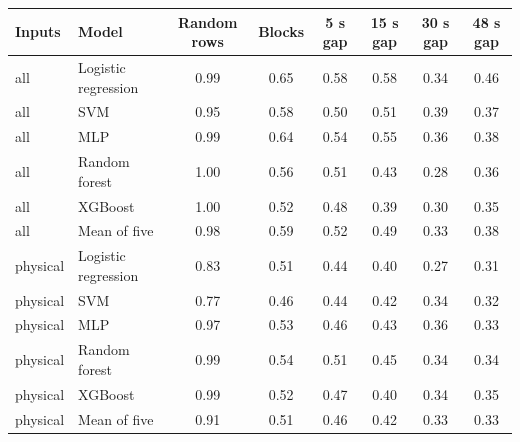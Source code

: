 \begin{tabular}{llcccccc}
\toprule
Inputs & Model & Random rows & Blocks & 5 s gap & 15 s gap & 30 s gap & 48 s gap \\
\midrule
all & Logistic regression & 0.99 & 0.65 & 0.58 & 0.58 & 0.34 & 0.46 \\
all & SVM & 0.95 & 0.58 & 0.50 & 0.51 & 0.39 & 0.37 \\
all & MLP & 0.99 & 0.64 & 0.54 & 0.55 & 0.36 & 0.38 \\
all & Random forest & 1.00 & 0.56 & 0.51 & 0.43 & 0.28 & 0.36 \\
all & XGBoost & 1.00 & 0.52 & 0.48 & 0.39 & 0.30 & 0.35 \\
all & Mean of five & 0.98 & 0.59 & 0.52 & 0.49 & 0.33 & 0.38 \\
physical & Logistic regression & 0.83 & 0.51 & 0.44 & 0.40 & 0.27 & 0.31 \\
physical & SVM & 0.77 & 0.46 & 0.44 & 0.42 & 0.34 & 0.32 \\
physical & MLP & 0.97 & 0.53 & 0.46 & 0.43 & 0.36 & 0.33 \\
physical & Random forest & 0.99 & 0.54 & 0.51 & 0.45 & 0.34 & 0.34 \\
physical & XGBoost & 0.99 & 0.52 & 0.47 & 0.40 & 0.34 & 0.35 \\
physical & Mean of five & 0.91 & 0.51 & 0.46 & 0.42 & 0.33 & 0.33 \\
\bottomrule
\end{tabular}

